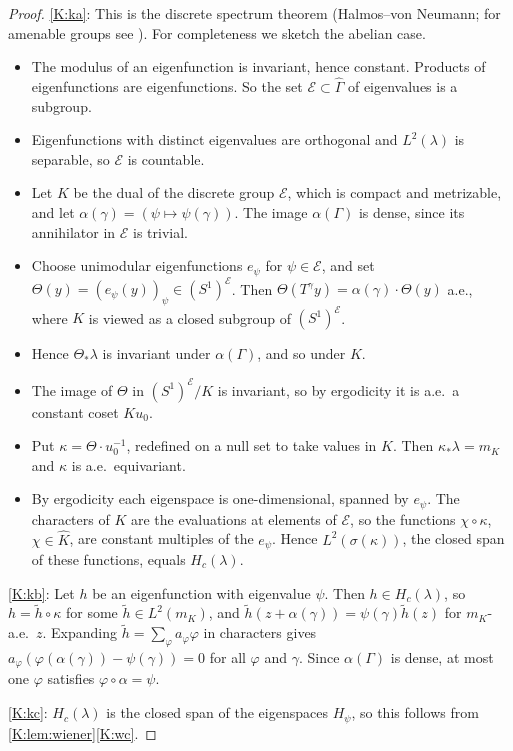 \begin{proof}
\ref{K:ka}: This is the discrete spectrum theorem (Halmos--von Neumann; for amenable groups
see \cite[Proposition~2.12]{charamaras2024finding}). For completeness we sketch the
abelian case.
\begin{itemize}
\item The modulus of an eigenfunction is invariant, hence constant. Products of
eigenfunctions are eigenfunctions. So the set $\mathcal E\subset\widehat\Gamma$ of
eigenvalues is a subgroup.
\item Eigenfunctions with distinct eigenvalues are orthogonal and $L^2(\lambda)$ is
separable, so $\mathcal E$ is countable.
\item Let $K$ be the dual of the discrete group $\mathcal E$, which is compact and metrizable,
and let $\alpha(\gamma)=(\psi\mapsto\psi(\gamma))$. The image $\alpha(\Gamma)$ is dense, since
its annihilator in $\mathcal E$ is trivial.
\item Choose unimodular eigenfunctions $e_\psi$ for $\psi\in\mathcal E$, and set
$\Theta(y)=(e_\psi(y))_{\psi}\in(S^1)^{\mathcal E}$. Then
$\Theta(T^\gamma y)=\alpha(\gamma)\cdot\Theta(y)$ a.e., where $K$ is viewed as a closed subgroup
of $(S^1)^{\mathcal E}$.
\item Hence $\Theta_*\lambda$ is invariant under $\alpha(\Gamma)$, and so under $K$.
\item The image of $\Theta$ in $(S^1)^{\mathcal E}/K$ is invariant, so by ergodicity it is
a.e.\ a constant coset $Ku_0$.
\item Put $\kappa=\Theta\cdot u_0^{-1}$, redefined on a null set to take values in $K$.
Then $\kappa_*\lambda=m_K$ and $\kappa$ is a.e.\ equivariant.
\item By ergodicity each eigenspace is one-dimensional, spanned by $e_\psi$. The characters
of $K$ are the evaluations at elements of $\mathcal E$, so the functions $\chi\circ\kappa$,
$\chi\in\widehat K$, are constant multiples of the $e_\psi$. Hence $L^2(\sigma(\kappa))$, the
closed span of these functions, equals $H_c(\lambda)$.
\end{itemize}

\ref{K:kb}: Let $h$ be an eigenfunction with eigenvalue $\psi$. Then $h\in H_c(\lambda)$, so
$h=\tilde h\circ\kappa$ for some $\tilde h\in L^2(m_K)$, and
$\tilde h(z+\alpha(\gamma))=\psi(\gamma)\tilde h(z)$ for $m_K$-a.e.\ $z$.
Expanding $\tilde h=\sum_\varphi a_\varphi\varphi$ in characters gives
$a_\varphi(\varphi(\alpha(\gamma))-\psi(\gamma))=0$ for all $\varphi$ and $\gamma$.
Since $\alpha(\Gamma)$ is dense, at most one $\varphi$ satisfies $\varphi\circ\alpha=\psi$.

\ref{K:kc}: $H_c(\lambda)$ is the closed span of the eigenspaces $H_\psi$, so this follows
from \cref{K:lem:wiener}\ref{K:wc}.
\end{proof}

